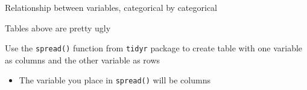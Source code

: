 \documentclass[8pt,ignorenonframetext,dvipsnames]{beamer}
\newenvironment{Shaded}{\begin{snugshade}}{\end{snugshade}}
\newcommand{\KeywordTok}[1]{\textcolor[rgb]{0.13,0.29,0.53}{\textbf{#1}}}
\newcommand{\StringTok}[1]{\textcolor[rgb]{0.31,0.60,0.02}{#1}}
\newcommand{\OperatorTok}[1]{\textcolor[rgb]{0.81,0.36,0.00}{\textbf{#1}}}
\newcommand{\NormalTok}[1]{#1}
\providecommand{\tightlist}{%
  \setlength{\itemsep}{0pt}\setlength{\parskip}{0pt}}
\renewcommand{\textbf}[1]{{\color{darkgray}\bfseries\fontfamily{Montserrat-TOsF}#1}}
\begin{document}
\begin{frame}[fragile]{Relationship between variables, categorical by
categorical}

Tables above are pretty ugly

Use the \texttt{spread()} function from \texttt{tidyr} package to create
table with one variable as columns and the other variable as rows

\begin{itemize}
\tightlist
\item
  The variable you place in \texttt{spread()} will be columns
\end{itemize}

\begin{Shaded}
\end{Shaded}

\end{frame}
\end{document}
